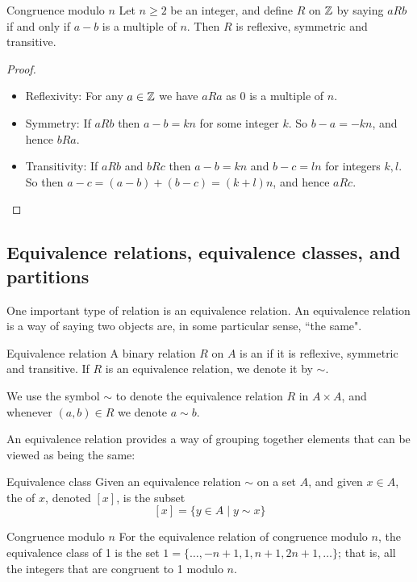 \begin{exmp}{Congruence modulo $n$}{}
Let $n \ge 2$ be an integer, and define $R$ on $\mathbb Z$ by saying $aRb$ if and only if $a-b$ is a multiple of $n$. Then $R$ is reflexive, symmetric and transitive.
\end{exmp}
\begin{proof} \
\begin{itemize}
\item Reflexivity: For any $a \in \mathbb Z$ we have $aRa$ as 0 is a multiple of $n$.
\item Symmetry: If $aRb$ then $a-b=kn$ for some integer $k$. So $b-a=-kn$, and hence $bRa$.
\item Transitivity: If $aRb$ and $bRc$ then $a-b=kn$ and $b-c=ln$ for integers $k,l$. So then $a-c=(a-b)+(b-c)=(k+l)n$, and hence $aRc$.
\end{itemize}
\end{proof}
\pagebreak

\subsection{Equivalence relations, equivalence classes, and partitions}
One important type of relation is an equivalence relation. An equivalence relation is a way of saying two objects are, in some particular sense, ``the same".

\begin{defn}{Equivalence relation}{}
A binary relation $R$ on $A$ is an  if it is reflexive, symmetric and transitive. If $R$ is an equivalence relation, we denote it by $\sim$.
\end{defn}

\begin{remark}
We use the symbol $\sim$ to denote the equivalence relation $R$ in $A \times A$, and whenever $(a,b)\in R$ we denote $a \sim b$.
\end{remark}

An equivalence relation provides a way of grouping together elements that can be viewed as being the same:

\begin{defn}{Equivalence class}{}
Given an equivalence relation $\sim$ on a set $A$, and given $x \in A$, the  of $x$, denoted $[x]$, is the subset
\[ [x] = \{y \in A \mid y \sim x\} \]
\end{defn}

\begin{exmp}{Congruence modulo $n$}{}
For the equivalence relation of congruence modulo $n$, the equivalence class of 1 is the set $1 = \{\dots, -n+1, 1, n+1, 2n+1, \dots\}$; that is, all the integers that are congruent to 1 modulo $n$.
\end{exmp}

